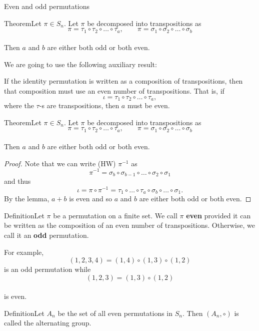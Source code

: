 \documentclass{beamer}
\def\bl[#1]#2{\begin{block}{#1}#2\end{block}}
\begin{document}
\begin{frame}{Even and odd permutations}
\bl[Theorem]{Let $\pi\in S_n$. Let $\pi$ be decomposed into transpositions as \vspace{-0.3cm}
\[
\pi=\tau_1\circ\tau_2\circ\dots\circ\tau_a,\qquad \pi=\sigma_1\circ\sigma_2\circ\dots\circ\sigma_b
\]\vspace{-0.8cm}\\
Then $a$ and $b$ are either both odd or both even.}

We are going to use the following auxiliary result:
\begin{lemma}
If the identity permutation is written as a composition of transpositions, then that composition must use an even number of transpositions. That is, if
\[
\iota=\tau_1\circ\tau_2\circ\dots\circ\tau_a,
\]
where the $\tau$-s are transpositions, then $a$ must be even.
\end{lemma}

\end{frame}

\begin{frame}
\bl[Theorem]{Let $\pi\in S_n$. Let $\pi$ be decomposed into transpositions as \vspace{-0.3cm}
\[
\pi=\tau_1\circ\tau_2\circ\dots\circ\tau_a,\qquad \pi=\sigma_1\circ\sigma_2\circ\dots\circ\sigma_b
\]\vspace{-0.8cm}\\
Then $a$ and $b$ are either both odd or both even.}

\begin{proof}
Note that we can write (HW) $\pi^{-1}$ as
\[
\pi^{-1}=\sigma_b\circ\sigma_{b-1}\circ\dots\circ\sigma_2\circ\sigma_1
\]
and thus
\[
\iota=\pi\circ\pi^{-1}=\tau_1\circ\dots\circ\tau_a\circ\sigma_b\circ\dots\circ\sigma_1.
\]
By the lemma, $a+b$ is even and so $a$ and $b$ are either both odd or both even.
\end{proof}
\end{frame}

\begin{frame}
\bl[Definition]{Let $\pi$ be a permutation on a finite set. We call $\pi$ \textbf{even} provided it can be written as the composition of an even number of transpositions. Otherwise, we call it an \textbf{odd} permutation.}

For example,
\[
(1,2,3,4)=(1,4)\circ(1,3)\circ (1,2)
\]
is an odd permutation while
\[
(1,2,3)=(1,3)\circ (1,2)
\]\vspace{-0.7cm}\\
is even.
\bl[Definition]{Let $A_n$ be the set of all even permutations in $S_n$. Then $(A_n,\circ)$ is called the alternating group.}
\end{frame}
\end{document}
